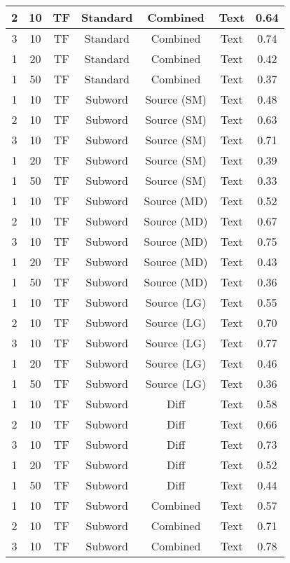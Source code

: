 \begin{longtable}{|c|c|c|c|c|c|c|}
\hline
2 & 10 & TF & Standard & Combined & Text & 0.64 \\
\hline
3 & 10 & TF & Standard & Combined & Text & 0.74 \\
\hline
1 & 20 & TF & Standard & Combined & Text & 0.42 \\
\hline
1 & 50 & TF & Standard & Combined & Text & 0.37 \\
\hline
1 & 10 & TF & Subword & Source (SM) & Text & 0.48 \\
\hline
2 & 10 & TF & Subword & Source (SM) & Text & 0.63 \\
\hline
3 & 10 & TF & Subword & Source (SM) & Text & 0.71 \\
\hline
1 & 20 & TF & Subword & Source (SM) & Text & 0.39 \\
\hline
1 & 50 & TF & Subword & Source (SM) & Text & 0.33 \\
\hline
1 & 10 & TF & Subword & Source (MD) & Text & 0.52 \\
\hline
2 & 10 & TF & Subword & Source (MD) & Text & 0.67 \\
\hline
3 & 10 & TF & Subword & Source (MD) & Text & 0.75 \\
\hline
1 & 20 & TF & Subword & Source (MD) & Text & 0.43 \\
\hline
1 & 50 & TF & Subword & Source (MD) & Text & 0.36 \\
\hline
1 & 10 & TF & Subword & Source (LG) & Text & 0.55 \\
\hline
2 & 10 & TF & Subword & Source (LG) & Text & 0.70 \\
\hline
3 & 10 & TF & Subword & Source (LG) & Text & 0.77 \\
\hline
1 & 20 & TF & Subword & Source (LG) & Text & 0.46 \\
\hline
1 & 50 & TF & Subword & Source (LG) & Text & 0.36 \\
\hline
1 & 10 & TF & Subword & Diff & Text & 0.58 \\
\hline
2 & 10 & TF & Subword & Diff & Text & 0.66 \\
\hline
3 & 10 & TF & Subword & Diff & Text & 0.73 \\
\hline
1 & 20 & TF & Subword & Diff & Text & 0.52 \\
\hline
1 & 50 & TF & Subword & Diff & Text & 0.44 \\
\hline
1 & 10 & TF & Subword & Combined & Text & 0.57 \\
\hline
2 & 10 & TF & Subword & Combined & Text & 0.71 \\
\hline
3 & 10 & TF & Subword & Combined & Text & 0.78 \\

\end{longtable}
